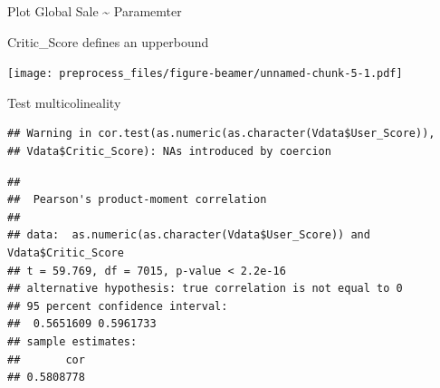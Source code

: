 \documentclass[ignorenonframetext,]{beamer}
\newenvironment{Shaded}{\begin{snugshade}}{\end{snugshade}}
\newcommand{\KeywordTok}[1]{\textcolor[rgb]{0.13,0.29,0.53}{\textbf{#1}}}
\newcommand{\NormalTok}[1]{#1}
\newcommand{\OperatorTok}[1]{\textcolor[rgb]{0.81,0.36,0.00}{\textbf{#1}}}
\begin{document}
\begin{frame}[fragile]{Plot Global Sale \textasciitilde{} Paramemter}
\protect\hypertarget{plot-global-sale-paramemter}{}

\begin{block}{Critic\_Score defines an upperbound}

\texttt{[image: preprocess\_files/figure-beamer/unnamed-chunk-5-1.pdf]}

\end{block}

\begin{block}{Test multicolineality}

\begin{Shaded}
\end{Shaded}

\begin{verbatim}
## Warning in cor.test(as.numeric(as.character(Vdata$User_Score)),
## Vdata$Critic_Score): NAs introduced by coercion
\end{verbatim}

\begin{verbatim}
## 
##  Pearson's product-moment correlation
## 
## data:  as.numeric(as.character(Vdata$User_Score)) and Vdata$Critic_Score
## t = 59.769, df = 7015, p-value < 2.2e-16
## alternative hypothesis: true correlation is not equal to 0
## 95 percent confidence interval:
##  0.5651609 0.5961733
## sample estimates:
##       cor 
## 0.5808778
\end{verbatim}

\end{block}

\end{frame}
\end{document}
